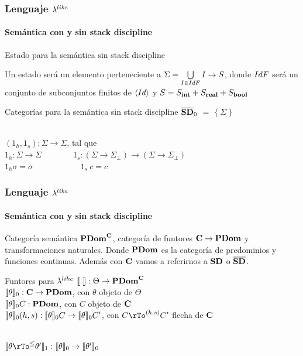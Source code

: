 \documentclass{beamer}
\begin{document}
\begin{frame}
\frametitle{Lenguaje $\lambda^{like}$}
\framesubtitle{Semántica con y sin stack discipline}

\begin{block}{Estado para la semántica sin stack discipline}

Un estado ser\'a un elemento perteneciente a 
$\Sigma = \bigcup\limits_{I \in IdF} I \rightarrow S$, 
donde $IdF$ ser\'a un conjunto de subconjuntos finitos de $\langle Id \rangle$ y
$S = S_{\textbf{int}} + S_{\textbf{real}} + S_{\textbf{bool}}$\\

\end{block}

\pause

\begin{block}{Categorías para la semántica sin stack discipline}
$\overline{\textbf{SD}}_0$ $=$ $\{\ \Sigma \ \}$\\

\

$(1_h,1_s) : \Sigma \rightarrow \Sigma$, tal que\\

$1_h : \Sigma \rightarrow \Sigma$ \ \ \ \ \ \ \
$1_s: (\Sigma \rightarrow \Sigma_{\bot}) \rightarrow (\Sigma \rightarrow \Sigma_{\bot})$\\
\indent
$1_h \sigma = \sigma$ \ \ \ \ \ \ \ \ \ \ \ $1_s \ c = c$

\end{block}

\end{frame}

\begin{frame}
\frametitle{Lenguaje $\lambda^{like}$}
\framesubtitle{Semántica con y sin stack discipline}

\begin{block}{Categoría semántica}
$\textbf{PDom}^{\textbf{C}}$, categoría de funtores $\textbf{C} \rightarrow \textbf{PDom}$ y transformaciones naturales.
Donde $\textbf{PDom}$ es la categoría de predominios y funciones continuas. Además con $\textbf{C}$ vamos a
referirnos a $\textbf{SD}$ o $\overline{\textbf{SD}}$.
\end{block}

\pause

\begin{block}{Funtores para $\lambda^{like}$}
$\llbracket  \  \rrbracket : \Theta \rightarrow \textbf{PDom}^{\textbf{C}}$\\
\pause
$\llbracket \theta \rrbracket_{0} : \textbf{C} \rightarrow \textbf{PDom}$, con $\theta$ objeto de $\Theta$\\
\pause
$\llbracket \theta \rrbracket_{0}C : \textbf{PDom}$, con $C$ objeto de $\textbf{C}$\\
\pause
$\llbracket \theta \rrbracket_{0}(h,s) : \llbracket \theta \rrbracket_{0}C \rightarrow \llbracket \theta \rrbracket_{0}C'$, con 
$C \rTo^{(h,s)} C'$ flecha de $\textbf{C}$\\

\

$\semBrcks{\theta \rTo^{\leq} \theta'}_{1} : 
	\semBrcks{\theta}_{0} \rightarrow \semBrcks{\theta'}_{0}$\\

\end{block}

\end{frame}
\end{document}

